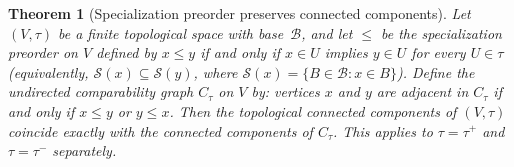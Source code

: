 \documentclass[11pt,a4paper]{article}
\theoremstyle{plain}
\newtheorem{theorem}{Theorem}[section]
\theoremstyle{definition}
\newcommand{\taufwd}{\tau^{+}}
\newcommand{\taubwd}{\tau^{-}}
\newcommand{\base}{\mathcal{B}}
\begin{document}

\begin{theorem}[Specialization preorder preserves connected components]%
\label{thm:specialization-components}
Let $(V, \tau)$ be a finite topological space with base~$\base$, and let
$\leq$ be the specialization preorder on $V$ defined by
$x \leq y$ if and only if $x \in U$ implies $y \in U$ for every $U \in \tau$
(equivalently, $\mathcal{S}(x) \subseteq \mathcal{S}(y)$, where
$\mathcal{S}(x) = \{B \in \base : x \in B\}$).  Define the undirected
comparability graph $C_\tau$ on $V$ by: vertices $x$ and $y$ are adjacent in
$C_\tau$ if and only if $x \leq y$ or $y \leq x$.  Then the topological
connected components of $(V, \tau)$ coincide exactly with the connected
components of $C_\tau$.  This applies to $\tau = \taufwd$ and
$\tau = \taubwd$ separately.
\end{theorem}
\end{document}
